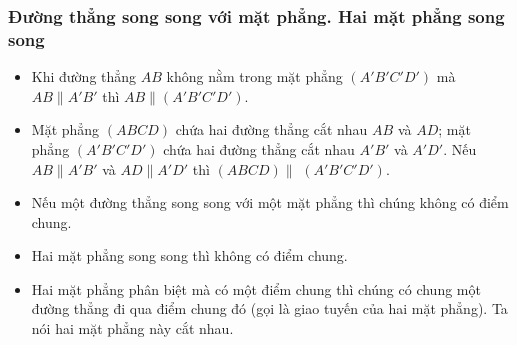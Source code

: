 \subsubsection{Đường thẳng song song với mặt phẳng. Hai mặt phẳng song song}
	\begin{itemize}
		\item Khi đường thẳng $AB$ không nằm trong mặt phẳng $(A'B'C'D')$ mà $AB\parallel A'B'$ thì $AB \parallel (A'B'C'D')$.
		\item Mặt phẳng $(ABCD)$ chứa hai đường thẳng cắt nhau $AB$ và $AD$; mặt phẳng $(A'B'C'D')$ chứa hai đường thẳng cắt nhau $A'B'$ và $A'D'$. Nếu $AB \parallel A'B'$ và $AD \parallel A'D'$ thì  $(ABCD) \parallel $ $(A'B'C'D')$.
	\end{itemize}
\begin{note}
	\begin{itemize}
		\item Nếu một đường thẳng song song với một mặt phẳng thì chúng không có điểm chung.
		\item Hai mặt phẳng song song thì không có điểm chung.
		\item Hai mặt phẳng phân biệt mà có một điểm chung thì chúng có chung một đường thẳng đi qua điểm chung đó (gọi là giao tuyến của hai mặt phẳng). Ta nói hai mặt phẳng này cắt nhau.
	\end{itemize}
\end{note}

